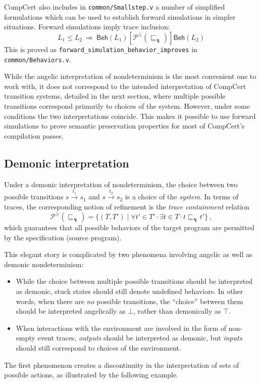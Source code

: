 \documentclass[sigplan,10pt,review,anonymous]{acmart}
\newcommand{\kw}[1]{\ensuremath{\mathsf{#1}}}
\newcommand{\refby}{\sqsubseteq}
\newcommand{\bdot}{\cdot}
\newcommand{\ifr}[1]{\mathrel{[{#1}]}}
\begin{document}
CompCert also includes in \texttt{common/Smallstep.v}
a number of simplified formulations
which can be used to establish forward simulations
in simpler situations.
Forward simulations imply trace inclusion:
\[
  L_1 \le L_2
  \: \Rightarrow \:
  \kw{Beh}(L_1) \ifr{\mathcal{P}^\le(\refby_\lightning)} \kw{Beh}(L_2)
\]
This is proved as \texttt{forward\_simulation\_behavior\_improves}
in \texttt{common/Behaviors.v}.

While the angelic interpretation
of nondeterminism is the most convenient one to work with,
it does not correspond to the intended interpretation
of CompCert transition systems,
detailed in the next section,
where multiple possible transitions correspond
primarily to choices of the system.
However,
under some conditions
the two interpretations coincide.
This makes it possible to use forward simulations
to prove semantic preservation properties
for most of CompCert's compilation passes.


\subsection{Demonic interpretation} %

Under a demonic interpretation of nondeterminism,
the choice between two possible transitions
$s \stackrel{t_1}{\longrightarrow} s_1$ and
$s \stackrel{t_2}{\longrightarrow} s_2$
is a choice of the \emph{system}.
In terms of traces,
the corresponding notion of refinement
is the \emph{trace containment} relation
\[
  \mathcal{P}^\ge({\refby_\lightning}) =
  \{ (T, T') \mid \forall t' \in T' \bdot \exists t \in T \bdot
    t \refby_\lightning t' \}
  \,,
\]
which guarantees that all possible behaviors of the target program
are permitted by the specification (source program).

This elegant story is complicated by two phenomena
involving angelic as well as demonic nondeterminism:
\begin{itemize}
  \item
    While the choice between multiple possible transitions
    should be interpreted as demonic,
    stuck states should still denote undefined behaviors.
    In other words,
    when there are \emph{no} possible transitions,
    the ``choice'' between them should be interpreted
    angelically as $\bot$,
    rather than demonically as $\top$.
  \item
    When interactions with the environment are involved
    in the form of non-empty event traces,
    \emph{outputs} should be interpreted as demonic,
    but \emph{inputs} should still correspond to
    choices of the environment.
\end{itemize}
The first phenomenon creates a discontinuity
in the interpretation of sets of possible actions,
as illustrated by the following example.
\end{document}
